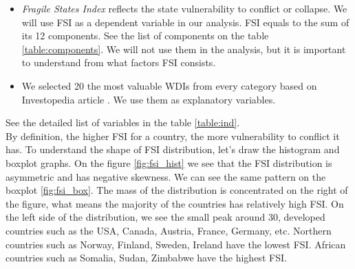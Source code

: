 \documentclass{article}
\begin{document}
\begin{itemize}
  \item \textit{Fragile States Index} reflects the state vulnerability to conflict or collapse. We will use FSI as a dependent variable in our analysis. FSI equals to the sum of its 12 components. See the list of components on the table \ref{table:components}. We will not use them in the analysis, but it is important to understand from what factors FSI consists.
  \item We selected 20 the most valuable WDIs from every category based on Investopedia article \cite{WDI_important}. We use them as explanatory variables.
\end{itemize}

See the detailed list of variables in the table \ref{table:ind}.\\

By definition, the higher FSI for a country, the more vulnerability to conflict it has. To understand the shape of FSI distribution, let's draw the histogram and boxplot graphs. On the figure \ref{fig:fsi_hist} we see that the FSI distribution is asymmetric and has negative skewness. We can see the same pattern on the boxplot \ref{fig:fsi_box}. The mass of the distribution is concentrated on the right of the figure, what means the majority of the countries has relatively high FSI. On the left side of the distribution, we see the small peak around 30, developed countries such as the USA, Canada, Austria, France, Germany, etc. Northern countries such as Norway, Finland, Sweden, Ireland have the lowest FSI. African countries such as Somalia, Sudan, Zimbabwe have the highest FSI. \\
\end{document}
